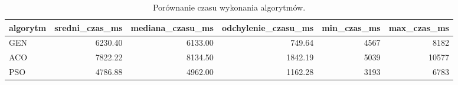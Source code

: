 \begin{table}
\caption{Porównanie czasu wykonania algorytmów.}
\label{tab:czas_wykonania}
\begin{tabular}{lrrrrr}
\toprule
algorytm & sredni_czas_ms & mediana_czasu_ms & odchylenie_czasu_ms & min_czas_ms & max_czas_ms \\
\midrule
GEN & 6230.40 & 6133.00 & 749.64 & 4567 & 8182 \\
ACO & 7822.22 & 8134.50 & 1842.19 & 5039 & 10577 \\
PSO & 4786.88 & 4962.00 & 1162.28 & 3193 & 6783 \\
\bottomrule
\end{tabular}
\end{table}
